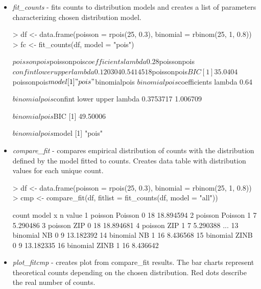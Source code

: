 \begin{itemize}
    \item \textit{fit\_counts} - fits counts to distribution models and creates a list of parameters characterizing chosen distribution model.

{\bfseries
\begin{example}
> df <- data.frame(poisson = rpois(25, 0.3), binomial = rbinom(25, 1, 0.8))
> fc <- fit_counts(df, model = "pois") 
\end{example}
}

\begin{example}
$poissonpois
$poissonpois$coefficients
lambda 
  0.28 

$poissonpois$confint
          lower     upper
lambda 0.120304 0.5414518

$poissonpois$BIC
[1] 35.0404

$poissonpois$model
[1] "pois"


$binomialpois
$binomialpois$coefficients
lambda 
  0.64 

$binomialpois$confint
           lower    upper
lambda 0.3753717 1.006709

$binomialpois$BIC
[1] 49.50006

$binomialpois$model
[1] "pois"
\end{example}


    \item \textit{compare\_fit} - compares empirical distribution of counts with the distribution defined by the model fitted to counts. Creates data table with distribution values for each unique count.


{\bfseries
\begin{example}
> df <- data.frame(poisson = rpois(25, 0.3), binomial = rbinom(25, 1, 0.8))
> cmp <- compare_fit(df, fitlist = fit_counts(df, model = "all"))
\end{example}
}

\begin{example}
      count   model x  n     value
1   poisson Poisson 0 18 18.894594
2   poisson Poisson 1  7  5.290486
3   poisson     ZIP 0 18 18.894681
4   poisson     ZIP 1  7  5.290388
...
13 binomial      NB 0  9 13.182392
14 binomial      NB 1 16  8.436568
15 binomial    ZINB 0  9 13.182335
16 binomial    ZINB 1 16  8.436642
\end{example}

    \item \textit{plot\_fitcmp} - creates plot from compare\_fit results. The bar charts represent theoretical counts depending on the chosen distribution. Red dots describe the real number of counts.


\end{itemize}
